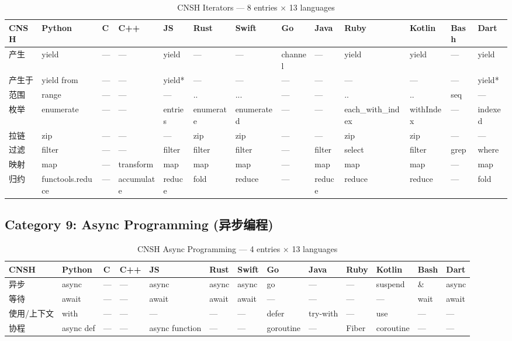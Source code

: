 \begin{table}[h]
\centering
\caption{CNSH Iterators — 8 entries × 13 languages}
\renewcommand{\arraystretch}{1.2}
\fontsize{8}{10}\selectfont
\begin{tabular}{lllllllllllll}
\toprule
\textbf{CNSH} & \textbf{Python} & \textbf{C} & \textbf{C++} & \textbf{JS} & \textbf{Rust} & \textbf{Swift} & \textbf{Go} & \textbf{Java} & \textbf{Ruby} & \textbf{Kotlin} & \textbf{Bash} & \textbf{Dart} \\
\midrule
产生 & yield & — & — & yield & — & — & channel & — & yield & yield & — & yield \\
产生于 & yield from & — & — & yield* & — & — & — & — & — & — & — & yield* \\
范围 & range & — & — & — & .. & ... & — & — & .. & .. & seq & — \\
枚举 & enumerate & — & — & entries & enumerate & enumerated & — & — & each\_with\_index & withIndex & — & indexed \\
拉链 & zip & — & — & — & zip & zip & — & — & zip & zip & — & — \\
过滤 & filter & — & — & filter & filter & filter & — & filter & select & filter & grep & where \\
映射 & map & — & transform & map & map & map & — & map & map & map & — & map \\
归约 & functools.reduce & — & accumulate & reduce & fold & reduce & — & reduce & reduce & reduce & — & fold \\
\bottomrule
\end{tabular}
\end{table}

\subsection{Category 9: Async Programming (异步编程)}
\label{app:ren-async}

\begin{table}[h]
\centering
\caption{CNSH Async Programming — 4 entries × 13 languages}
\renewcommand{\arraystretch}{1.2}
\fontsize{8}{10}\selectfont
\begin{tabular}{lllllllllllll}
\toprule
\textbf{CNSH} & \textbf{Python} & \textbf{C} & \textbf{C++} & \textbf{JS} & \textbf{Rust} & \textbf{Swift} & \textbf{Go} & \textbf{Java} & \textbf{Ruby} & \textbf{Kotlin} & \textbf{Bash} & \textbf{Dart} \\
\midrule
异步 & async & — & — & async & async & async & go & — & — & suspend & \& & async \\
等待 & await & — & — & await & await & await & — & — & — & — & wait & await \\
使用/上下文 & with & — & — & — & — & — & defer & try-with & — & use & — & — \\
协程 & async def & — & — & async function & — & — & goroutine & — & Fiber & coroutine & — & — \\
\bottomrule
\end{tabular}
\end{table}

